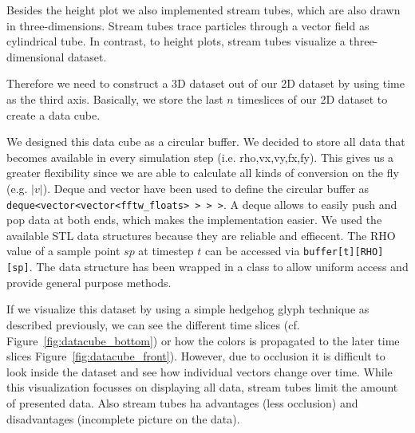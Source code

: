 Besides the height plot we also implemented stream tubes, which are also drawn in three-dimensions. Stream tubes trace particles through a vector field as cylindrical tube. In contrast, to  height plots, stream tubes visualize a three-dimensional dataset. 

Therefore we need to construct a 3D dataset out of our 2D dataset by using time as the third axis. Basically, we store the last $n$ timeslices of our 2D dataset to create a data cube. 

We designed this data cube as a circular buffer. We decided to store all data that becomes available in every simulation step (i.e. rho,vx,vy,fx,fy). This gives us a greater flexibility since we are able to calculate all kinds of conversion on the fly (e.g. $|v|$).  
Deque and vector have been used to define the circular buffer as \verb| deque<vector<vector<fftw_floats> > > >|.  A deque  allows to easily push and pop data at both ends, which makes the implementation easier. 
We used the available STL data structures because they are reliable and effiecent.
The RHO value of a sample point $sp$  at timestep $t$ can be accessed via  \verb|buffer[t][RHO][sp]|. The data structure has been wrapped in a class to allow uniform access and provide general purpose methods. 


If we visualize this dataset by using a simple hedgehog glyph technique as described previously, we can see the different time slices (cf. Figure~\ref{fig:datacube_bottom}) or how the colors is propagated to the later time slices  Figure~\ref{fig:datacube_front}). However, due to occlusion it is difficult to look inside the dataset  and see how individual vectors change over time. While this visualization focusses on displaying all data, stream tubes limit the amount of presented data. Also stream tubes ha advantages (less occlusion) and disadvantages (incomplete picture on the data).

